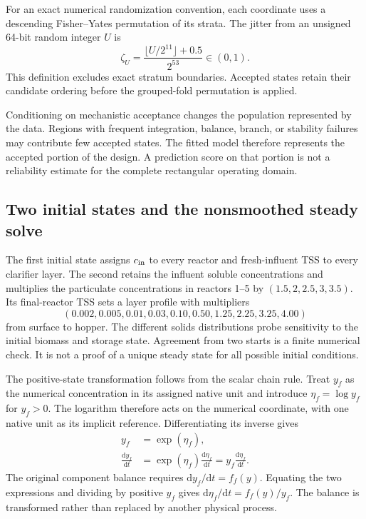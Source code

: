 For an exact numerical randomization convention, each coordinate uses a descending Fisher--Yates permutation of its strata. The jitter from an unsigned 64-bit random integer $U$ is
\begin{equation}
\zeta_U=\frac{\lfloor U/2^{11}\rfloor+0.5}{2^{53}}\in(0,1).
\end{equation}
This definition excludes exact stratum boundaries. Accepted states retain their candidate ordering before the grouped-fold permutation is applied.

Conditioning on mechanistic acceptance changes the population represented by the data. Regions with frequent integration, balance, branch, or stability failures may contribute few accepted states. The fitted model therefore represents the accepted portion of the design. A prediction score on that portion is not a reliability estimate for the complete rectangular operating domain.

\subsection{Two initial states and the nonsmoothed steady solve}

The first initial state assigns $c_{\rm in}$ to every reactor and fresh-influent TSS to every clarifier layer. The second retains the influent soluble concentrations and multiplies the particulate concentrations in reactors 1--5 by $(1.5,2,2.5,3,3.5)$. Its final-reactor TSS sets a layer profile with multipliers
\begin{equation}
(0.002,0.005,0.01,0.03,0.10,0.50,1.25,2.25,3.25,4.00)
\label{eq:plant_initial_layer_multipliers}
\end{equation}
from surface to hopper. The different solids distributions probe sensitivity to the initial biomass and storage state. Agreement from two starts is a finite numerical check. It is not a proof of a unique steady state for all possible initial conditions.

The positive-state transformation follows from the scalar chain rule. Treat $y_f$ as the numerical concentration in its assigned native unit and introduce $\eta_f=\log y_f$ for $y_f>0$. The logarithm therefore acts on the numerical coordinate, with one native unit as its implicit reference. Differentiating its inverse gives
\[
\begin{aligned}
y_f&=\exp(\eta_f),\\
\frac{\mathrm d y_f}{\mathrm dt}
&=\exp(\eta_f)\frac{\mathrm d\eta_f}{\mathrm dt}
=y_f\frac{\mathrm d\eta_f}{\mathrm dt}.
\end{aligned}
\]
The original component balance requires $\mathrm d y_f/\mathrm dt=f_f(y)$. Equating the two expressions and dividing by positive $y_f$ gives $\mathrm d\eta_f/\mathrm dt=f_f(y)/y_f$. The balance is transformed rather than replaced by another physical process.


